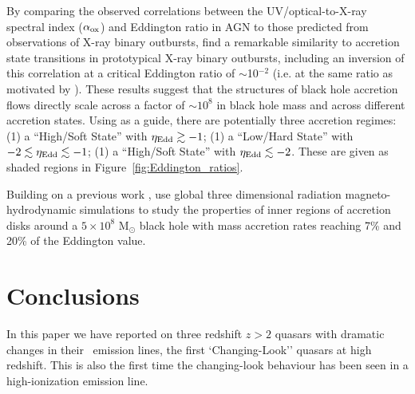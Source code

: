 \documentclass[fleqn,usenatbib]{mnras}
\begin{document}
By comparing the observed correlations between the UV/optical-to-X-ray
spectral index ($\alpha_{\rm ox}$) and Eddington ratio in AGN to those
predicted from observations of X-ray binary outbursts,
\citet{Ruan2019a} find a remarkable similarity to accretion state transitions in prototypical
X-ray binary outbursts, including an inversion of this correlation at
a critical Eddington ratio of $\sim$10$^{-2}$ (i.e. at the same ratio
as motivated by \citet{NodaDone2018}).  These results suggest that the
structures of black hole accretion flows directly scale across a
factor of $\sim10^{8}$ in black hole mass and across different
accretion states. Using \citet{Ruan2019a} as a guide, there are potentially three accretion regimes: 
(1) a ``High/Soft State'' with $\eta_{\rm Edd} \gtrsim -1$; 
(1) a ``Low/Hard State'' with $-2 \lesssim \eta_{\rm Edd} \lesssim  -1$;
(1) a ``High/Soft State'' with $\eta_{\rm Edd} \lesssim -2$.
These are given as shaded regions in Figure~\ref{fig:Eddington_ratios}.

Building on a previous work \citep[e.g.,][]{JiangYF2014, JiangYF2016, JiangYF2019}, \citet{JiangYF2019arXiv} use global three dimensional radiation magneto-hydrodynamic simulations to study the properties of inner regions of accretion disks around a $5 \times 10^{8}$ M$_{\odot}$ black hole with mass accretion rates reaching 7\% and 20\% of the Eddington value.


\section{Conclusions}
In this paper we have reported on three redshift $z>2$ quasars with
dramatic changes in their \civ\ emission lines, the first
`Changing-Look'' quasars at high redshift.  This is also the first
time the changing-look behaviour has been seen in a high-ionization
emission line.
\end{document}
